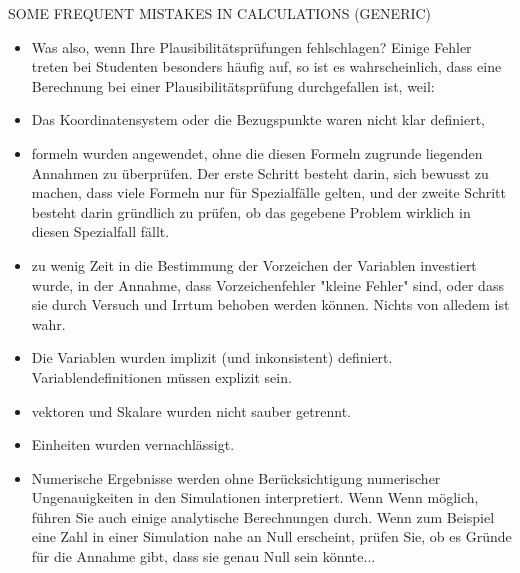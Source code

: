SOME FREQUENT MISTAKES IN CALCULATIONS (GENERIC)
\begin{itemize}
    \item Was also, wenn Ihre Plausibilitätsprüfungen fehlschlagen? Einige Fehler treten bei Studenten besonders häufig auf, so ist es wahrscheinlich, dass eine Berechnung bei einer Plausibilitätsprüfung durchgefallen ist, weil: 
    \item Das Koordinatensystem oder die Bezugspunkte waren nicht klar definiert,
    \item formeln wurden angewendet, ohne die diesen Formeln zugrunde liegenden Annahmen zu überprüfen. Der erste Schritt besteht darin, sich bewusst zu machen, dass viele Formeln nur für Spezialfälle gelten, und der zweite Schritt besteht darin gründlich zu prüfen, ob das gegebene Problem wirklich in diesen Spezialfall fällt.
    \item zu wenig Zeit in die Bestimmung der Vorzeichen der Variablen investiert wurde, in der Annahme, dass Vorzeichenfehler 
"kleine Fehler" sind, oder dass sie durch Versuch und Irrtum behoben werden können. Nichts von alledem ist wahr. 
    \item Die Variablen wurden implizit (und inkonsistent) definiert. Variablendefinitionen müssen explizit sein. 
    \item vektoren und Skalare wurden nicht sauber getrennt. 
    \item Einheiten wurden vernachlässigt. 
        \item Numerische Ergebnisse werden ohne Berücksichtigung numerischer Ungenauigkeiten in den Simulationen interpretiert. Wenn 
Wenn möglich, führen Sie auch einige analytische Berechnungen durch. Wenn zum Beispiel eine Zahl in einer Simulation nahe an 
Null erscheint, prüfen Sie, ob es Gründe für die Annahme gibt, dass sie genau Null sein könnte...
\end{itemize}


